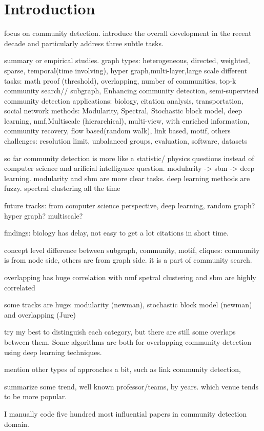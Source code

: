 \chapter{Introduction}
focus on community detection. introduce the overall development in the recent decade and particularly address three subtle tasks.


summary or empirical studies.
graph types: heterogeneous, directed, weighted, sparse, temporal(time involving), hyper graph,multi-layer,large scale
different tasks: math proof (threshold), overlapping, number of communities, top-k community search// subgraph, Enhancing community detection, semi-supervised community detection
applications: biology, citation analysis, transportation, social network
methods: Modularity, Spectral, Stochastic block model,  deep learning, nmf,Multiscale (hierarchical), multi-view, with enriched information, community recovery, flow based(random walk), link based, motif, others
challenges: resolution limit, unbalanced groups,
evaluation, software, datasets


so far community detection is more like a statistic/ physics questions instead of computer science and arificial intelligence question. 
modularity -> sbm -> deep learning. modularity and sbm are more clear tasks. deep learning methods are fuzzy.
spectral clustering all the time


future tracks: from computer science perspective, deep learning, random graph? hyper graph? multiscale?

findings: biology has delay, not easy to get a lot citations in short time.

concept level difference between subgraph, community, motif, cliques: community is from node side, others are from graph side. it is a part of community search.

overlapping has huge correlation with nmf
spetral clustering and sbm are highly correlated

some tracks are huge: modularity (newman), stochastic block model (newman) and overlapping (Jure)

try my best to distinguish each category, but there are still some overlaps between them. Some algorithms are both for overlapping community detection using deep learning techniques.

mention other types of approaches a bit, such as link community detection, 

summarize some trend, well known professor/teams, by years. which venue tends to be more popular.

I manually code five hundred most influential papers in community detection domain.
\cite{newman2012communities}






